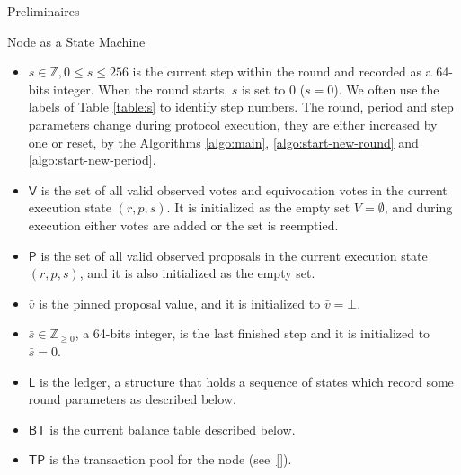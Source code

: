 \documentclass[10pt,a4paper]{article}
\begin{document}
\begin{section}{Preliminaires}
\begin{subsection}{Node as a State Machine}
\begin{itemize}
    \item 
    $s\in\mathbb{Z}, 0\le s\le 256$ is the current {\sf step} within the round 
    and recorded as a 64-bits integer. When the round starts, $s$ is set to 0 ($s=0$). 
    We often use the labels of Table \ref{table:s} to identify step numbers.
    The round, period and step parameters change during protocol execution, they are 
    either increased by one or reset, by the Algorithms \ref{algo:main}, \ref{algo:start-new-round} 
    and \ref{algo:start-new-period}.
    
    \item
    $\mathsf{V}$ is the set of all valid {\sf observed votes} and 
    {\sf equivocation votes} in the current execution state
    $(r,p,s)$. It is initialized as the empty set $V=\emptyset$, and during execution
    either votes are added or the set is reemptied.
    
    \item
    $\mathsf{P}$ is the set of all valid {\sf observed proposals}
    in the current execution state $(r,p,s)$, and it is also initialized as the empty set.
    
    \item
    $\bar{v}$ is the {\sf pinned proposal value}, and it is initialized to $\bar{v}=\bot$.
    
    \item
    $\bar{s}\in\mathbb{Z}_{\ge 0}$, a 64-bits integer, is the {\sf last finished step}
    and it is initialized to $\bar{s}=0$.
    
    \item
    $\mathsf{L}$ is the {\sf ledger}, a structure that holds a sequence of states which
    record some round parameters as described below.
    
    \item
    $\mathsf{BT}$ is the current balance table  described below.

    \item
    $\mathsf{TP}$ is the transaction pool for the node (see~\ref{}).


\end{itemize}
\end{subsection}
\end{section}
\end{document}

